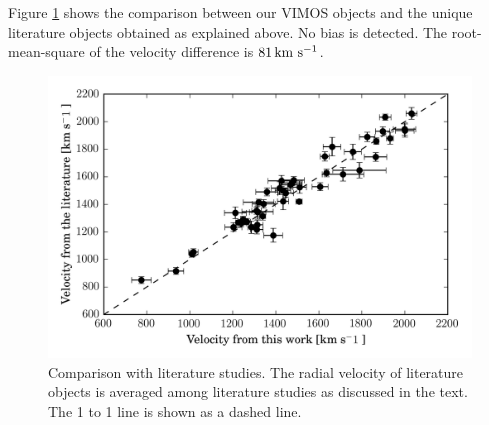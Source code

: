 \documentclass[useAMS,usenatbib]{mn2e}
\newcommand{\kms}{\mbox{\,km~s$^{-1}$}}
\begin{document}
Figure \ref{fig:vel_comparison} shows the comparison between our VIMOS 
objects and the unique literature objects obtained as explained above. No 
bias is detected. The root-mean-square of the velocity difference is $81 \kms$. 



\begin{figure}
\centering
\includegraphics[width=\columnwidth]{figures/vel_literature.png} 
\caption{Comparison with literature studies. The radial velocity of literature 
objects is averaged among literature studies as discussed in the text. The 1 to 
1 line is shown as a dashed line. }
\label{fig:vel_comparison}
\end{figure}
 
\end{document}
